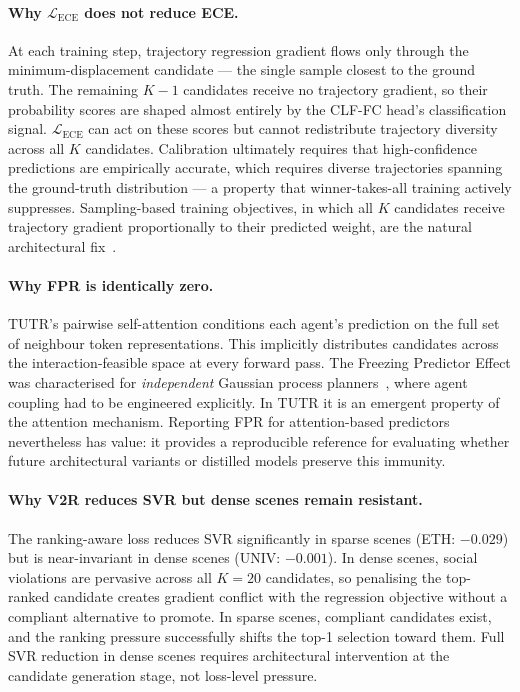 \documentclass{article}
\begin{document}
\paragraph{Why \(\mathcal{L}_{\text{ECE}}\) does not reduce ECE.}
At each training step, trajectory regression gradient flows only through the
minimum-displacement candidate --- the single sample closest to the ground
truth. The remaining \(K-1\) candidates receive no trajectory gradient, so
their probability scores are shaped almost entirely by the CLF-FC head's
classification signal. \(\mathcal{L}_{\text{ECE}}\) can act on these scores
but cannot redistribute trajectory diversity across all \(K\) candidates.
Calibration ultimately requires that high-confidence predictions are
empirically accurate, which requires diverse trajectories spanning the
ground-truth distribution --- a property that winner-takes-all training
actively suppresses. Sampling-based training objectives, in which all \(K\)
candidates receive trajectory gradient proportionally to their predicted
weight, are the natural architectural fix~\cite{karandikar2021soft}.

\paragraph{Why FPR is identically zero.}
TUTR's pairwise self-attention conditions each agent's prediction on the full
set of neighbour token representations. This implicitly distributes candidates
across the interaction-feasible space at every forward pass. The Freezing
Predictor Effect was characterised for \emph{independent} Gaussian process
planners~\cite{trautman2010unfreezing}, where agent coupling had to be
engineered explicitly. In TUTR it is an emergent property of the attention
mechanism. Reporting FPR for attention-based predictors nevertheless has
value: it provides a reproducible reference for evaluating whether future
architectural variants or distilled models preserve this immunity.

\paragraph{Why V2R reduces SVR but dense scenes remain resistant.}
The ranking-aware loss reduces SVR significantly in sparse scenes (ETH:
\(-0.029\)) but is near-invariant in dense scenes (UNIV: \(-0.001\)). In
dense scenes, social violations are pervasive across all \(K=20\) candidates,
so penalising the top-ranked candidate creates gradient conflict with the
regression objective without a compliant alternative to promote. In sparse
scenes, compliant candidates exist, and the ranking pressure successfully
shifts the top-1 selection toward them. Full SVR reduction in dense scenes
requires architectural intervention at the candidate generation stage, not
loss-level pressure.
\end{document}
